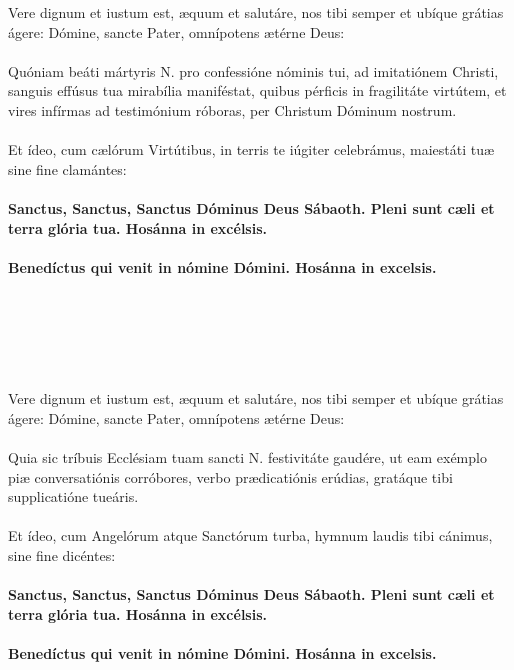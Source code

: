 \documentclass[12pt, a4paper]{article}
\begin{document}
	\\
	\\
	\\
	\\
	\\
	Vere dignum et iustum est, æquum
	et salutáre, nos tibi semper et
	ubíque grátias ágere: Dómine,
	sancte Pater, omnípotens ætérne
	Deus:
	\\\\
	Quóniam beáti mártyris N. pro confessióne nóminis tui,
	ad imitatiónem Christi,
	sanguis effúsus tua mirabília maniféstat,
	quibus pérficis in fragilitáte virtútem,
	et vires infírmas ad testimónium róboras,
	per Christum Dóminum nostrum.
	\\\\
	Et ídeo, cum cælórum Virtútibus,
	in terris te iúgiter celebrámus,
	maiestáti tuæ sine fine clamántes: 
	\\\\
	\textbf{Sanctus, Sanctus, Sanctus Dóminus
		Deus Sábaoth. Pleni sunt cæli et
		terra glória tua. Hosánna in
		excélsis.}
	\\\\
	\textbf{Benedíctus qui venit in nómine
		Dómini. Hosánna in excelsis.}
	
	\newpage
	
	\\
	\\
	\\
	\\
	\\
	Vere dignum et iustum est, æquum
	et salutáre, nos tibi semper et
	ubíque grátias ágere: Dómine,
	sancte Pater, omnípotens ætérne
	Deus:
	\\\\
	Quia sic tríbuis Ecclésiam tuam sancti N. festivitáte gaudére,
	ut eam exémplo piæ conversatiónis corróbores,
	verbo prædicatiónis erúdias,
	gratáque tibi supplicatióne tueáris.
	\\\\
	Et ídeo, cum Angelórum atque Sanctórum turba,
	hymnum laudis tibi cánimus, sine fine dicéntes:  
	\\\\
	\textbf{Sanctus, Sanctus, Sanctus Dóminus
		Deus Sábaoth. Pleni sunt cæli et
		terra glória tua. Hosánna in
		excélsis.}
	\\\\
	\textbf{Benedíctus qui venit in nómine
		Dómini. Hosánna in excelsis.}
	
\end{document}
